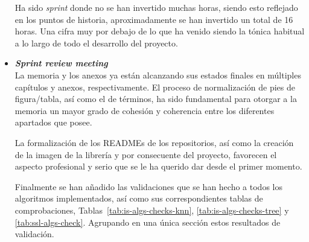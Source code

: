 \begin{itemize}
Ha sido \textit{sprint} donde no se han invertido muchas horas, siendo esto reflejado en los puntos de historia, aproximadamente se han invertido un total de 16 horas. Una cifra muy por debajo de lo que ha venido siendo la tónica habitual a lo largo de todo el desarrollo del proyecto. 

\item \textbf{\textit{Sprint review meeting}}\\
La memoria y los anexos ya están alcanzando sus estados finales en múltiples capítulos y anexos, respectivamente. El proceso de normalización de pies de figura/tabla, así como el de términos, ha sido fundamental para otorgar a la memoria un mayor grado de cohesión y coherencia entre los diferentes apartados que posee.

La formalización de los READMEs de los repositorios, así como la creación de la imagen de la librería y por consecuente del proyecto, favorecen el aspecto profesional y serio que se le ha querido dar desde el primer momento.

Finalmente se han añadido las validaciones que se han hecho a todos los algoritmos implementados, así como sus correspondientes tablas de comprobaciones, Tablas~\ref{tab:is-algs-checks-knn}, \ref{tab:is-algs-checks-tree} y \ref{tab:ssl-algs-check}. Agrupando en una única sección estos resultados de validación.

\end{itemize}

